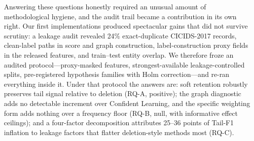 \documentclass[pdflatex,referee,lineno,sn-basic,Numbered]{sn-jnl}
\begin{document}
Answering these questions honestly required an unusual amount of methodological
hygiene, and the audit trail became a contribution in its own right. Our first
implementations produced spectacular gains that did not survive scrutiny: a
leakage audit revealed 24\% exact-duplicate CICIDS-2017 records, clean-label
paths in score and graph construction, label-construction proxy fields in the
released features, and train--test entity overlap. We therefore froze an
audited protocol---proxy-masked features, strongest-available
leakage-controlled splits, pre-registered hypothesis families with Holm
correction---and re-ran
everything inside it. Under that protocol the answers are: soft retention
robustly preserves tail signal relative to deletion (RQ-A, positive); the graph
diagnostic adds no detectable increment over Confident Learning, and the
specific weighting form adds nothing over a frequency floor (RQ-B, null, with
informative effect ceilings); and a four-factor decomposition attributes 25--36
points of Tail-F1 inflation to leakage factors that flatter deletion-style
methods most (RQ-C).
\end{document}
